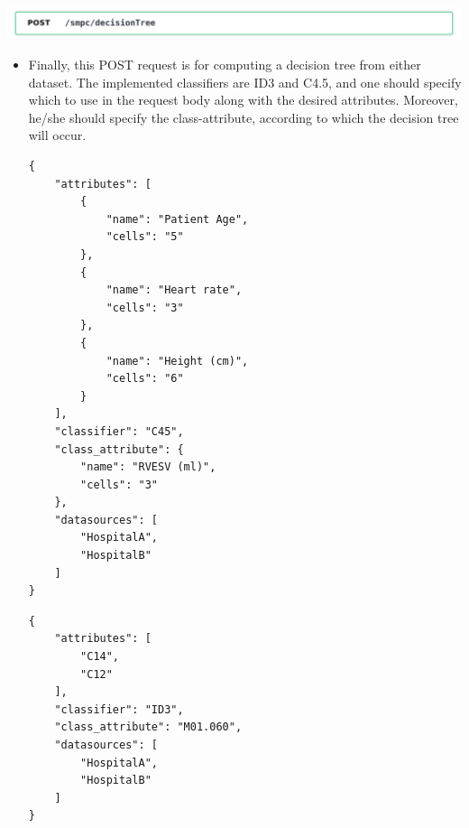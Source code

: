 \includegraphics[page=1,width=\textwidth]{figures/post3.pdf}
\begin{itemize}
\item[]
Finally, this POST request is for computing a decision tree from either dataset.
The implemented classifiers are ID3 and C4.5, and one should specify which to use in the request body along with the desired attributes.
Moreover, he/she should specify the class-attribute, according to which the decision tree will occur.

{
\begin{verbatim}
{
    "attributes": [
        {
            "name": "Patient Age",
            "cells": "5"
        },
        {
            "name": "Heart rate",
            "cells": "3"
        },
        {
            "name": "Height (cm)",
            "cells": "6"
        }
    ],
    "classifier": "C45",
    "class_attribute": {
        "name": "RVESV (ml)",
        "cells": "3"
    },
    "datasources": [
        "HospitalA",
        "HospitalB"
    ]
}
\end{verbatim}
\label{sc:decisionTree-post-numerical}
}

{
\begin{verbatim}
{
    "attributes": [
        "C14",
        "C12"
    ],
    "classifier": "ID3",
    "class_attribute": "M01.060",
    "datasources": [
        "HospitalA",
        "HospitalB"
    ]
}
\end{verbatim}
\label{sc:decisionTree-post-categorical}
}
\end{itemize}


